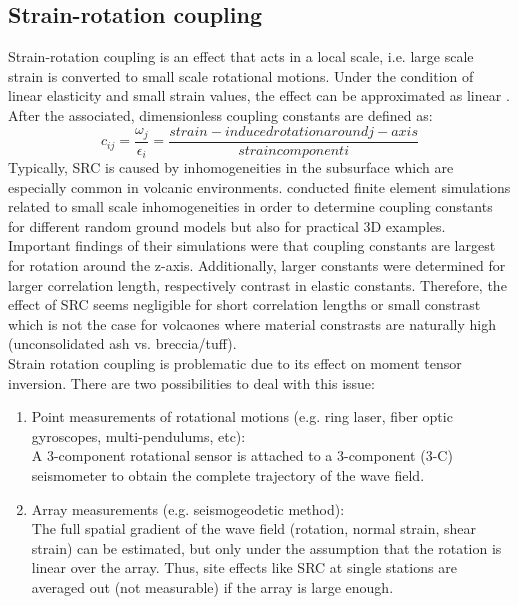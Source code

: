 \documentclass[12pt, a4paper]{article}
\begin{document}
\subsection*{Strain-rotation coupling}
Strain-rotation coupling is an effect that acts in a local scale, i.e. large scale strain is converted to small scale rotational motions. Under the condition of linear elasticity and small strain values, the effect can be approximated as linear \citep{vanDriel2012}. After \citet{Harrison1976} the associated, dimensionless coupling constants are defined as:
\begin{equation}
	c_{ij} = \frac{\omega_j}{\epsilon_i} = \frac{strain-induced rotation around j-axis}{strain component i}
\end{equation} 
Typically, SRC is caused by inhomogeneities in the subsurface which are especially common in volcanic environments. \citet{vanDriel2012} conducted finite element simulations related to small scale inhomogeneities in order to determine coupling constants for different random ground models but also for practical 3D examples.\\
Important findings of their simulations were that coupling constants are largest for rotation around the z-axis. Additionally, larger constants were determined for larger correlation length, respectively contrast in elastic constants. Therefore, the effect of SRC seems negligible for short correlation lengths or small constrast which is not the case for volcaones where material constrasts are naturally high (unconsolidated ash vs. breccia/tuff).\\
Strain rotation coupling is problematic due to its effect on moment tensor inversion. There are two possibilities to deal with this issue:
\begin{enumerate}
	\singlespacing
	\item Point measurements of rotational motions (e.g. ring laser, fiber optic gyroscopes, multi-pendulums, etc):\\
	A 3-component rotational sensor is attached to a 3-component (3-C) seismometer to obtain the complete trajectory of the wave field.
	\item Array measurements (e.g. seismogeodetic method):\\
	The full spatial gradient of the wave field (rotation, normal strain, shear strain) can be estimated, but only under the assumption that the rotation is linear over the array. Thus, site effects like SRC at single stations are averaged out (not measurable) if the array is large enough.
\end{enumerate}
\end{document}
